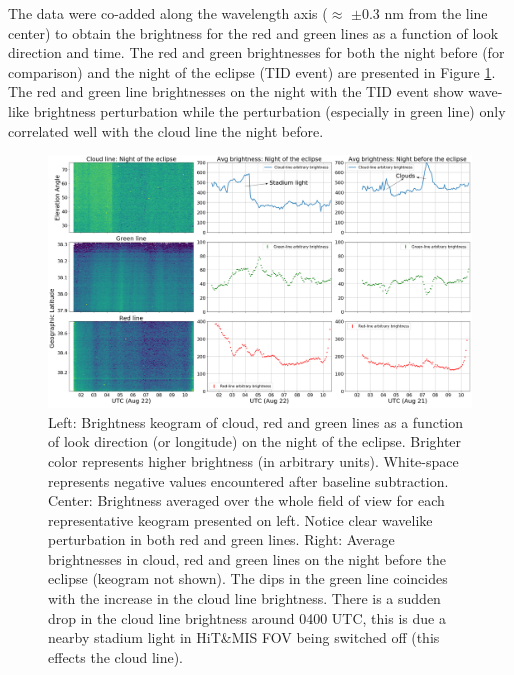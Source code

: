 The data were co-added along the wavelength axis ($\approx$ $\pm$0.3 nm from the line center) to obtain the brightness for the red and green lines as a function of look direction and time.
The red and green brightnesses for both the night before (for comparison) and the night of the eclipse (TID event) are presented in Figure \ref{fig:keo_profile}. The red and green line brightnesses on the night with the TID event show wave-like brightness perturbation while the perturbation (especially in green line) only correlated well with the cloud line the night before.
\begin{figure}
 \centering\includegraphics[width=35pc]{car_Aug2122_both.png}
 \caption{Left: Brightness keogram of cloud, red and green lines as a function of look direction (or longitude) on the night of the eclipse. Brighter color represents higher brightness (in arbitrary units).  White-space represents negative values encountered after baseline subtraction. Center: Brightness averaged over the whole field of view for each representative keogram presented on left. Notice clear wavelike perturbation in both red and green lines. Right: Average brightnesses in cloud, red and green lines on the night before the eclipse (keogram not shown).  The dips in the green line coincides with the increase in the cloud line brightness. There is a sudden drop in the cloud line brightness around 0400 UTC, this is due a nearby stadium light in HiT\&MIS FOV being switched off (this effects the cloud line). }
 \label{fig:keo_profile}
 \end{figure}
